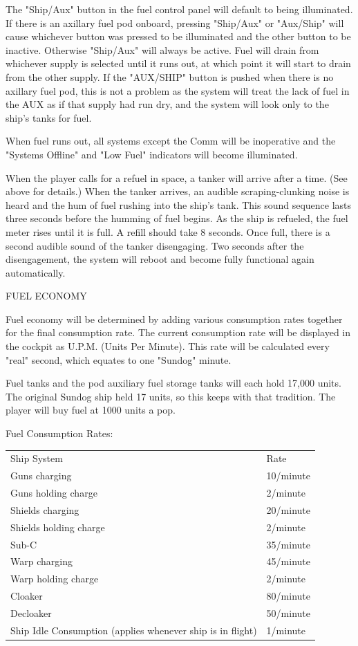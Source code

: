 \begin{itemize}
The "Ship\slash Aux" button in the fuel control panel will default to
being illuminated.  If there is an axillary fuel pod onboard, pressing
"Ship\slash Aux" or "Aux\slash Ship" will cause whichever button was
pressed to be illuminated and the other button to be inactive.  Otherwise
"Ship\slash Aux" will always be active.  Fuel will drain from whichever
supply is selected until it runs out, at which point it will start to drain
from the other supply.  If the "AUX\slash SHIP" button is pushed when there is no axillary
fuel pod, this is not a problem as the system will treat the lack of fuel in the AUX as if that supply had run dry, and the system will look only to the ship's tanks for fuel. 

When fuel runs out, all systems except the Comm will be inoperative and
the "Systems Offline" and "Low Fuel" indicators will become illuminated.

When the player calls for a refuel in space, a tanker will arrive after a time. (See above for details.) When the tanker arrives, an audible scraping-clunking noise is heard and the hum of fuel rushing into the ship's tank. This sound sequence lasts three seconds before the humming of fuel begins. As the ship is refueled, the fuel meter rises until it is full. A refill should take 8 seconds. Once full, there is a second audible sound of the tanker disengaging. Two seconds after the disengagement, the system will reboot and become fully functional again automatically. 


FUEL ECONOMY 

Fuel economy will be determined by adding various consumption rates together for the final consumption rate. The current consumption rate will be displayed in the cockpit as U.P.M. (Units Per Minute). This rate will be calculated every "real" second, which equates to one "Sundog" minute. 

Fuel tanks and the pod auxiliary fuel storage tanks will each hold 17,000 units.  The original Sundog ship held 17 units, so this keeps with that tradition. The player will buy fuel at 1000 units a pop.

Fuel Consumption Rates:

\begin{tabular}{ | l | l | }
\hline
Ship System & Rate \\
Guns charging & 10\slash minute \\
Guns holding charge & 2\slash minute \\
Shields charging & 20\slash minute \\
Shields holding charge & 2\slash minute \\
Sub-C & 35\slash minute \\
Warp charging & 45\slash minute \\
Warp holding charge & 2\slash minute \\
Cloaker & 80\slash minute \\
Decloaker & 50\slash minute \\
Ship Idle Consumption (applies whenever ship is in flight) & 1\slash minute \\
\hline
\end{tabular}


\end{itemize}
